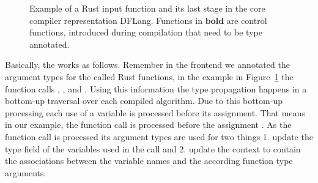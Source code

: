 \begin{figure}[H]
\centering
\tabskip=0pt
\caption{Example of a Rust input function and its last stage in the core compiler representation DFLang. Functions in $\mathbf{bold}$ are control functions, introduced during compilation that need to be type annotated.}
\label{fig:TypePropagationExample}
\end{figure}


Basically, the  works as follows. Remember in the frontend we annotated the argument types for the called Rust functions, in the example in Figure~\ref{fig:TypePropagationExample} the function calls , ,  and . Using this information the type propagation happens in a bottom-up traversal over each compiled algorithm. Due to this bottom-up processing each use of a variable is processed before its assignment. That means in our example, the function call  is processed before the assignment . As the function call is processed its argument types are used for two things 1. update the type field of the variables used in the call and 2. update the context to contain the associations between the variable names and the according function type arguments. \\

